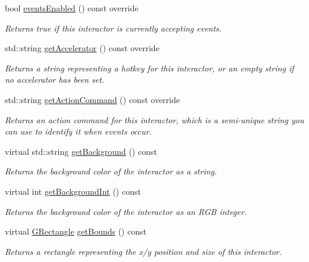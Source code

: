 \begin{DoxyCompactItemize}
bool \mbox{\hyperlink{classsgl_1_1GInteractor_a597a370b592e3737d38d9d2f4e2031ea}{events\+Enabled}} () const override
\begin{DoxyCompactList}\small\item\em Returns true if this interactor is currently accepting events. \end{DoxyCompactList}\item 
std\+::string \mbox{\hyperlink{classsgl_1_1GButton_a57806dc9defb73f76f493f8548319924}{get\+Accelerator}} () const override
\begin{DoxyCompactList}\small\item\em Returns a string representing a hotkey for this interactor, or an empty string if no accelerator has been set. \end{DoxyCompactList}\item 
std\+::string \mbox{\hyperlink{classsgl_1_1GButton_a4f83505141da1f8446f0e0e0a9507930}{get\+Action\+Command}} () const override
\begin{DoxyCompactList}\small\item\em Returns an action command for this interactor, which is a semi-\/unique string you can use to identify it when events occur. \end{DoxyCompactList}\item 
virtual std\+::string \mbox{\hyperlink{classsgl_1_1GInteractor_a808e22cc1fdfbecf71ed8c64ef4600e0}{get\+Background}} () const
\begin{DoxyCompactList}\small\item\em Returns the background color of the interactor as a string. \end{DoxyCompactList}\item 
virtual int \mbox{\hyperlink{classsgl_1_1GInteractor_a9e827257a55cb8cf4d9de2ec6bcfd7a0}{get\+Background\+Int}} () const
\begin{DoxyCompactList}\small\item\em Returns the background color of the interactor as an R\+GB integer. \end{DoxyCompactList}\item 
virtual \mbox{\hyperlink{structsgl_1_1GRectangle}{G\+Rectangle}} \mbox{\hyperlink{classsgl_1_1GInteractor_a29e6ac35a0b48f491a4c88194cc5da3b}{get\+Bounds}} () const
\begin{DoxyCompactList}\small\item\em Returns a rectangle representing the x/y position and size of this interactor. \end{DoxyCompactList}\item 

\end{DoxyCompactItemize}
